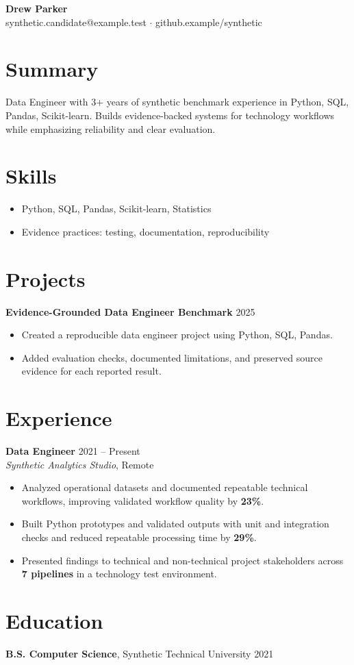 \documentclass[10pt,letterpaper]{article}
\begin{document}
\begin{center}
{\Large \textbf{Drew Parker}}\\
synthetic.candidate@example.test $\cdot$ github.example/synthetic
\end{center}

\section*{Summary}
Data Engineer with 3+ years of synthetic benchmark experience in Python, SQL, Pandas, Scikit-learn. Builds evidence-backed systems for technology workflows while emphasizing reliability and clear evaluation.

\section*{Skills}
\begin{itemize}
  \item Python, SQL, Pandas, Scikit-learn, Statistics
  \item Evidence practices: testing, documentation, reproducibility
\end{itemize}

\section*{Projects}
\textbf{Evidence-Grounded Data Engineer Benchmark} \hfill 2025
\begin{itemize}
  \item Created a reproducible data engineer project using Python, SQL, Pandas.
  \item Added evaluation checks, documented limitations, and preserved source evidence for each reported result.
\end{itemize}

\section*{Experience}
\textbf{Data Engineer} \hfill 2021 -- Present\\
\textit{Synthetic Analytics Studio}, Remote
\begin{itemize}
  \item Analyzed operational datasets and documented repeatable technical workflows, improving validated workflow quality by \textbf{23\%}.
  \item Built Python prototypes and validated outputs with unit and integration checks and reduced repeatable processing time by \textbf{29\%}.
  \item Presented findings to technical and non-technical project stakeholders across \textbf{7 pipelines} in a technology test environment.
\end{itemize}

\section*{Education}
\textbf{B.S. Computer Science}, Synthetic Technical University \hfill 2021
\end{document}
